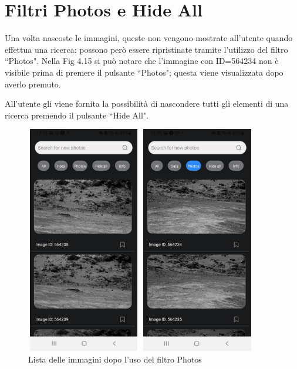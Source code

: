 \section*{Filtri Photos e Hide All}
Una volta nascoste le immagini, queste non vengono mostrate all'utente quando effettua una ricerca: possono per\`o essere ripristinate tramite l'utilizzo del filtro ``Photos".
Nella Fig 4.15 si pu\`o notare che l'immagine con ID=564234 non \`e visibile prima di premere il pulsante ``Photos"; questa viene visualizzata dopo averlo premuto.

All'utente gli viene fornita la possibilit\`a di nascondere tutti gli elementi di una ricerca premendo il pulsante ``Hide All".
\begin{figure}[h]
    \begin{minipage}[h]{0.47\textwidth}
        \centering
        \includegraphics[width=5cm, height=10cm]{images/immaginiAndroid/prePhotos.jpg}
        \caption{\label{prePhotosAndroid} Lista delle immagini prima di usare il filtro Photos}
    \end{minipage}
    \hfill
    \begin{minipage}[h]{0.47\textwidth}
        \centering
        \includegraphics[width=5cm, height=10cm]{images/immaginiAndroid/postPhotos.jpg}
        \caption{\label{postPhotosAndroid} Lista delle immagini dopo l'uso del filtro Photos}
    \end{minipage}
\end{figure}
